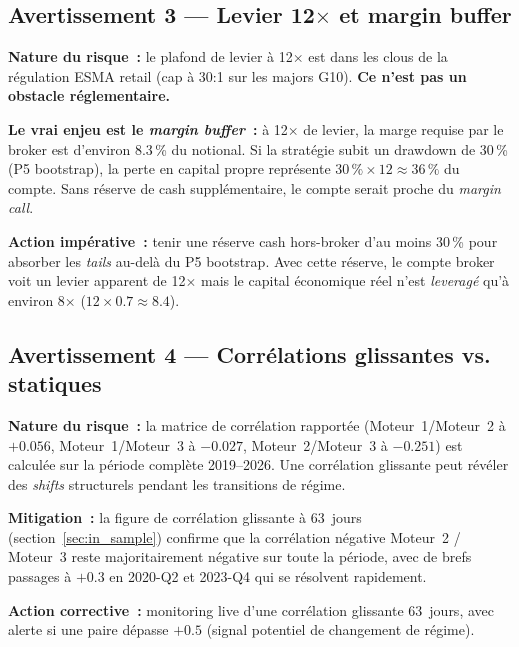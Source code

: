 \subsection{Avertissement 3 --- Levier 12$\times$ et margin buffer}

\begin{warningbox}
\textbf{Nature du risque~:} le plafond de levier à 12$\times$ est dans les clous de la régulation ESMA retail (cap à 30:1 sur les majors G10). \textbf{Ce n'est pas un obstacle réglementaire.}

\textbf{Le vrai enjeu est le \emph{margin buffer}~:} à 12$\times$ de levier, la marge requise par le broker est d'environ 8.3\,\% du notional. Si la stratégie subit un drawdown de 30\,\% (P5 bootstrap), la perte en capital propre représente $30\,\% \times 12 \approx 36\,\%$ du compte. Sans réserve de cash supplémentaire, le compte serait proche du \emph{margin call}.

\textbf{Action impérative~:} tenir une réserve cash hors-broker d'au moins 30\,\% pour absorber les \emph{tails} au-delà du P5 bootstrap. Avec cette réserve, le compte broker voit un levier apparent de 12$\times$ mais le capital économique réel n'est \emph{leveragé} qu'à environ 8$\times$ ($12 \times 0.7 \approx 8.4$).
\end{warningbox}

\subsection{Avertissement 4 --- Corrélations glissantes vs. statiques}

\begin{warningbox}
\textbf{Nature du risque~:} la matrice de corrélation rapportée (Moteur~1/Moteur~2 à $+0.056$, Moteur~1/Moteur~3 à $-0.027$, Moteur~2/Moteur~3 à $-0.251$) est calculée sur la période complète 2019--2026. Une corrélation glissante peut révéler des \emph{shifts} structurels pendant les transitions de régime.

\textbf{Mitigation~:} la figure de corrélation glissante à 63~jours (section~\ref{sec:in_sample}) confirme que la corrélation négative Moteur~2 / Moteur~3 reste majoritairement négative sur toute la période, avec de brefs passages à $+0.3$ en 2020-Q2 et 2023-Q4 qui se résolvent rapidement.

\textbf{Action corrective~:} monitoring live d'une corrélation glissante 63~jours, avec alerte si une paire dépasse $+0.5$ (signal potentiel de changement de régime).
\end{warningbox}

